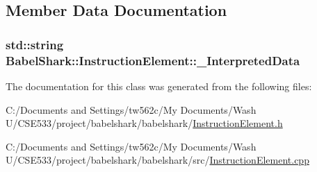 \subsection{Member Data Documentation}
\hypertarget{class_babel_shark_1_1_instruction_element_01c033e3d23cf2ecc64807520ac706aa}{
\subsubsection[{\_\-InterpretedData}]{\setlength{\rightskip}{0pt plus 5cm}std::string {\bf BabelShark::InstructionElement::\_\-InterpretedData}}}
\label{class_babel_shark_1_1_instruction_element_01c033e3d23cf2ecc64807520ac706aa}




The documentation for this class was generated from the following files:\begin{CompactItemize}
\item 
C:/Documents and Settings/tw562c/My Documents/Wash U/CSE533/project/babelshark/babelshark/\hyperlink{_instruction_element_8h}{InstructionElement.h}\item 
C:/Documents and Settings/tw562c/My Documents/Wash U/CSE533/project/babelshark/babelshark/src/\hyperlink{_instruction_element_8cpp}{InstructionElement.cpp}\end{CompactItemize}
